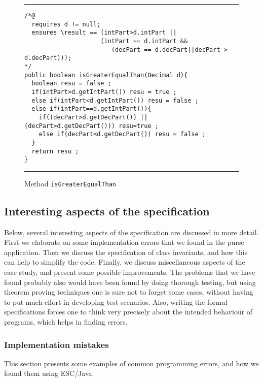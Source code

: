 \documentclass[a4paper]{llncs}
\begin{document}
\begin{figure}[t]
\rule{\linewidth}{0.3mm}
\begin{verbatim}
/*@
  requires d != null;
  ensures \result == (intPart>d.intPart ||
                     (intPart == d.intPart && 
                        (decPart == d.decPart||decPart > d.decPart)));
*/
public boolean isGreaterEqualThan(Decimal d){
  boolean resu = false ;
  if(intPart>d.getIntPart()) resu = true ;
  else if(intPart<d.getIntPart()) resu = false ;
  else if(intPart==d.getIntPart()){
    if((decPart>d.getDecPart()) || (decPart>d.getDecPart())) resu=true ;
    else if(decPart<d.getDecPart()) resu = false ;
  }
  return resu ;
}
\end{verbatim}
\caption{Method {\tt isGreaterEqualThan}}
\label{fig-cla-dec}
\rule{\linewidth}{0.3mm}
\end{figure}


\subsection{Interesting aspects of the specification}\label{SectSpecDetails}
Below, several interesting aspects of the specification are discussed
in more detail. First we elaborate on some implementation errors that
we found in the purse application.  Then we discuss the specification
of class invariants, and how this can help to simplify the
code. Finally, we discuss miscellaneous aspects of the case study, and
present some possible improvements. The problems that we have found
probably also would have been found by doing thorough testing, but
using theorem proving techniques one is sure not to forget some cases,
without having to put much effort in developing test scenarios.  Also,
writing the formal specifications forces one to think very precisely
about the intended behaviour of programs, which helps in finding
errors.






\subsubsection{Implementation mistakes}
This section presents some examples of common programming
errors, and how we found them using ESC/Java.
\end{document}
